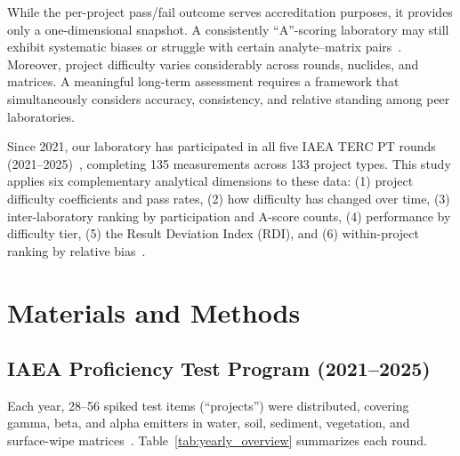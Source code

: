 \documentclass[12pt,a4paper,twoside]{article}
\begin{document}
While the per-project pass/fail outcome serves accreditation purposes, it provides only a one-dimensional snapshot. A consistently ``A''-scoring laboratory may still exhibit systematic biases or struggle with certain analyte--matrix pairs~\cite{siddique2012,cujic2019}. Moreover, project difficulty varies considerably across rounds, nuclides, and matrices. A meaningful long-term assessment requires a framework that simultaneously considers accuracy, consistency, and relative standing among peer laboratories.

Since 2021, our laboratory has participated in all five IAEA TERC PT rounds (2021--2025)~\cite{iaea2021report,iaea2022report,iaea2023report,iaea2024report,iaea2025report}, completing 135 measurements across 133 project types. This study applies six complementary analytical dimensions to these data: (1) project difficulty coefficients and pass rates, (2) how difficulty has changed over time, (3) inter-laboratory ranking by participation and A-score counts, (4) performance by difficulty tier, (5) the Result Deviation Index (RDI), and (6) within-project ranking by relative bias~\cite{karfopoulos2025}.

\section{Materials and Methods}

\subsection{IAEA Proficiency Test Program (2021--2025)}

Each year, 28--56 spiked test items (``projects'') were distributed, covering gamma, beta, and alpha emitters in water, soil, sediment, vegetation, and surface-wipe matrices~\cite{hou2008}. Table~\ref{tab:yearly_overview} summarizes each round.
\end{document}
